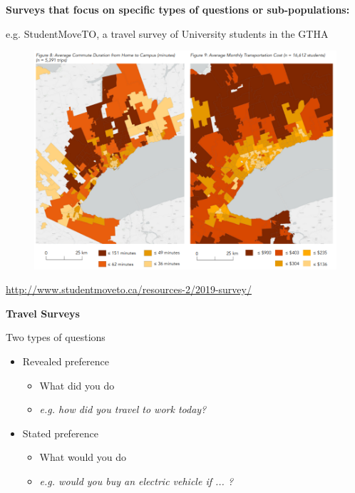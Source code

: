 \documentclass[aspectratio=169]{beamer}
\begin{document}
\begin{frame}
	
	\textbf{Surveys that focus on specific types of questions or sub-populations:}
	\vspace{2mm}
	
	e.g. StudentMoveTO, a travel survey of University students in the GTHA
	
	\begin{figure}
		\centering
		\includegraphics[width=0.7\linewidth]{images/smto_maps.png}
	\end{figure}
	
	\tiny\url{http://www.studentmoveto.ca/resources-2/2019-survey/}
	
\end{frame}






\begin{frame}
	
	\textbf{Travel Surveys}
	
	\vspace{2mm}

Two types of questions

\vspace{2mm}

	\begin{itemize}
		
		\item Revealed preference
		\begin{itemize}
			\item What did you do
			\item \textit{e.g. how did you travel to work today?}
		\end{itemize}
		
		\item Stated preference
		\begin{itemize}
			\item What would you do
			\item \textit{e.g. would you buy an electric vehicle if ... ?}
		\end{itemize}
		
	\end{itemize}
	
\end{frame}
\end{document}

